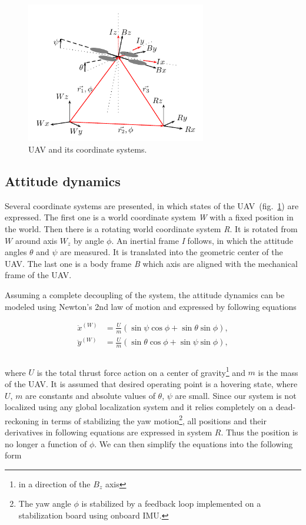 \begin{figure}[!h]
\centering
\includegraphics[width=0.7\textwidth]{fig/coordinate_system.pdf}
\caption{UAV and its coordinate systems.}
\label{fig:coordinate_system}
\end{figure}

\subsection{Attitude dynamics}

Several coordinate systems are presented, in which states of the UAV~(fig.~\ref{fig:coordinate_system}) are expressed. The first one is a world coordinate system \textit{W} with a fixed position in the world. Then there is a rotating world coordinate system \textit{R}. It is rotated from $W$ around axis $W_z$ by angle $\phi$. An inertial frame \textit{I} follows, in which the attitude angles $\theta$ and $\psi$ are measured. It is translated into the geometric center of the UAV. The last one is a body frame \textit{B} which axis are aligned with the mechanical frame of the UAV.

Assuming a complete decoupling of the system, the attitude dynamics can be modeled using Newton's 2nd law of motion and expressed by following equations

\begin{equation}
\begin{split}
\ddot{x}^{(W)} &= \frac{U}{m}\left(\sin\psi\cos\phi + \sin\theta\sin\phi\right),\\
\ddot{y}^{(W)} &= \frac{U}{m}\left(\sin\theta\cos\phi + \sin\psi\sin\phi\right),\\
\end{split}
\end{equation}
\\
where $U$ is the total thrust force action on a center of gravity\footnote{in a direction of the $B_z$ axis} and $m$ is the mass of the UAV. It is assumed that desired operating point is a hovering state, where $U$, $m$ are constants and absolute values of $\theta$, $\psi$ are small. Since our system is not localized using any global localization system and it relies completely on a dead-reckoning in terms of stabilizing the yaw motion\footnote{The yaw angle $\phi$ is stabilized by a feedback loop implemented on a stabilization board using onboard IMU.}, all positions and their derivatives in following equations are expressed in system $R$. Thus the position is no longer a function of $\phi$. We can then simplify the equations into the following form

